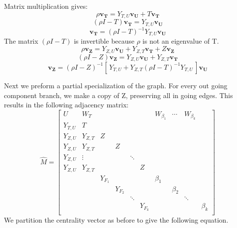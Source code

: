 \documentclass{paper}
\begin{document}
Matrix multiplication gives:
\[\rho \mathbf{v_T} = Y_{T,U}\mathbf{v_U} + T \mathbf{v_T} \]
\[(\rho I - T) \mathbf{v_T} = Y_{T,U}\mathbf{v_U} \]
\[\mathbf{v_T} = (\rho I - T)^{-1}Y_{T,U}\mathbf{v_U}
\]
The matrix $(\rho I - T)$ is invertible because $\rho$ is not an eigenvalue of T.
\[\rho \mathbf{v_Z} = Y_{Z,U}\mathbf{v_U} + Y_{Z,T}\mathbf{v_T} + Z \mathbf{v_Z} \]
\[(\rho I - Z) \mathbf{v_Z} = Y_{Z,U}\mathbf{v_U} + Y_{Z,T}\mathbf{v_T}\]
\[\mathbf{v_Z} = (\rho I - Z)^{-1}[\,Y_{T,U} + Y_{Z,T}(\rho I - T)^{-1}Y_{T,U}\,]\mathbf{v_U}
\]


Next we preform a partial specialization of the graph. For every out going  component branch, we make a copy of Z, preserving all in going edges. This results in the following adjacency matrix:
\[\hat{M} = 
\begin{bmatrix}
U & W_{T}&  &  & & & W_{\beta_{1}} & \cdots & W_{\beta_{k}} \\
Y_{T,U}  & T &  &  &  &  \\
Y_{Z,U}  & Y_{Z,T} & Z & \\
Y_{Z,U}  & Y_{Z,T} &  & Z \\
Y_{Z,U}  & \vdots & & &\ddots & \\
Y_{Z,U}  & Y_{Z,T} & & & & Z\\
  
  & & Y_{F_1}  &  &  & &\beta_1 & \\
  & & & Y_{F_2}  &  &  & &\beta_2 & \\

  & & & &\ddots &   &  & &\ddots & \\
  & & & & & Y_{F_k} & & & &\beta_k \\

\end{bmatrix}
\]
We partition the centrality vector as before to give the following equation.
\end{document}

